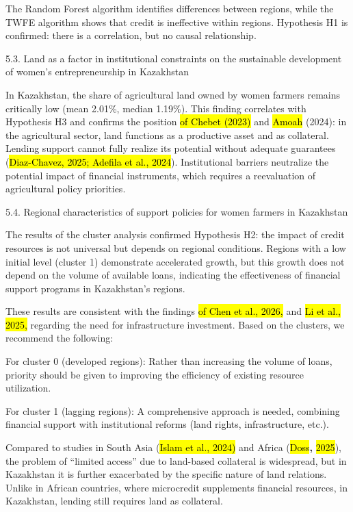 \documentclass[
]{article}
\begin{document}
The Random Forest algorithm identifies differences between regions,
while the TWFE algorithm shows that credit is ineffective within
regions. Hypothesis H1 is confirmed: there is a correlation, but no
causal relationship.

5.3. Land as a factor in institutional constraints on the sustainable
development of women's entrepreneurship in Kazakhstan

In Kazakhstan, the share of agricultural land owned by women farmers
remains critically low (mean 2.01\%, median 1.19\%). This finding
correlates with Hypothesis H3 and confirms the position \hl{of Chebet
(2023)} and \hl{Amoah} (2024): in the agricultural sector, land
functions as a productive asset and as collateral. Lending support
cannot fully realize its potential without adequate guarantees
(\hl{Diaz-Chavez, 2025; Adefila et al., 2024}). Institutional barriers
neutralize the potential impact of financial instruments, which requires
a reevaluation of agricultural policy priorities.

5.4. Regional characteristics of support policies for women farmers in
Kazakhstan

The results of the cluster analysis confirmed Hypothesis H2: the impact
of credit resources is not universal but depends on regional conditions.
Regions with a low initial level (cluster 1) demonstrate accelerated
growth, but this growth does not depend on the volume of available
loans, indicating the effectiveness of financial support programs in
Kazakhstan's regions.

These results are consistent with the findings \hl{of Chen et al.,
2026,} and \hl{Li et al., 2025,} regarding the need for infrastructure
investment. Based on the clusters, we recommend the following:

For cluster 0 (developed regions): Rather than increasing the volume of
loans, priority should be given to improving the efficiency of existing
resource utilization.

For cluster 1 (lagging regions): A comprehensive approach is needed,
combining financial support with institutional reforms (land rights,
infrastructure, etc.).

Compared to studies in South Asia (\hl{Islam et al., 2024)} and Africa
(\hl{Doss}\textbf{,} \hl{2025}), the problem of ``limited access'' due
to land-based collateral is widespread, but in Kazakhstan it is further
exacerbated by the specific nature of land relations. Unlike in African
countries, where microcredit supplements financial resources, in
Kazakhstan, lending still requires land as collateral.
\end{document}
